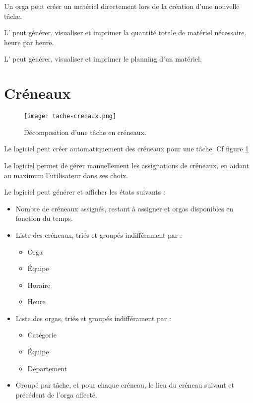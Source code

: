 Un orga peut créer un matériel directement lors de la création d'une nouvelle tâche.

L'\oh{} peut générer, visualiser et imprimer la quantité totale de matériel nécessaire, heure par heure.

L'\oh{} peut générer, visualiser et imprimer le planning d'un matériel.

\section{Créneaux}

\begin{figure}[h!t]
\centering
\texttt{[image: tache-crenaux.png]}

\caption{Décomposition d'une tâche en créneaux.}
\label{fig:crenaux}
\end{figure}



Le logiciel peut créer automatiquement des créneaux pour une tâche. Cf figure \ref{fig:crenaux}


Le logiciel permet de gérer manuellement les assignations de créneaux, en aidant au maximum l'utilisateur dans ses choix.

Le logiciel peut générer et afficher les états suivants : 

\begin{itemize}
\item Nombre de créneaux assignés, restant à assigner et orgas disponibles en fonction du temps.
\item Liste des créneaux, triés et groupés indifférament par : 	\begin{itemize}
								  \item Orga
								  \item Équipe
								  \item Horaire
\item Heure
								 \end{itemize}
\item Liste des orgas, triés et groupés indifférament par :  	\begin{itemize}
								  \item Catégorie
								  \item Équipe
								  \item Département
								 \end{itemize}
\item Groupé par tâche, et pour chaque créneau, le lieu du créneau suivant et précédent de l'orga affecté.

\end{itemize}

